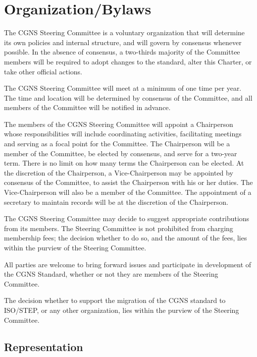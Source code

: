 \section{Organization/Bylaws}
\label{s:organization}
\thispagestyle{plain}

The CGNS Steering Committee is a voluntary organization that will
determine its own policies and internal structure, and will govern by
consensus whenever possible.
In the absence of consensus, a two-thirds majority of the Committee
members will be required to adopt changes to the standard, alter this
Charter, or take other official actions.

The CGNS Steering Committee will meet at a minimum of one time per year.
The time and location will be determined by consensus of the Committee,
and all members of the Committee will be notified in advance.

The members of the CGNS Steering Committee will appoint a Chairperson
whose responsibilities will include coordinating activities,
facilitating meetings and serving as a focal point for the Committee.
The Chairperson will be a member of the Committee, be elected by
consensus, and serve for a two-year term.
There is no limit on how many terms the Chairperson can be elected.
At the discretion of the Chairperson, a Vice-Chairperson may be
appointed by consensus of the Committee, to assist the Chairperson with
his or her duties.
The Vice-Chairperson will also be a member of the Committee.
The appointment of a secretary to maintain records will be at the
discretion of the Chairperson.

The CGNS Steering Committee may decide to suggest appropriate
contributions from its members.
The Steering Committee is not prohibited from charging membership fees;
the decision whether to do so, and the amount of the fees, lies within
the purview of the Steering Committee.

All parties are welcome to bring forward issues and participate in
development of the CGNS Standard, whether or not they are members of the
Steering Committee.

The decision whether to support the migration of the CGNS standard to
ISO/STEP, or any other organization, lies within the purview of the
Steering Committee.

\subsection{Representation}
\label{s:representation}

